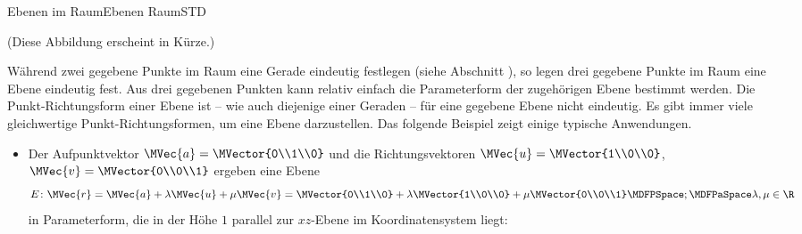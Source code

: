 \begin{MXContent}{Ebenen im Raum}{Ebenen Raum}{STD}
\begin{MInfo}
% 

(Diese Abbildung erscheint in Kürze.)

\end{MInfo}

Während zwei gegebene Punkte im Raum eine Gerade eindeutig festlegen (siehe Abschnitt ), so legen drei gegebene Punkte im Raum eine Ebene eindeutig fest. Aus drei gegebenen Punkten kann relativ einfach die Parameterform der zugehörigen Ebene bestimmt werden. Die Punkt-Richtungsform einer Ebene ist -- wie auch diejenige einer Geraden -- für eine gegebene Ebene nicht eindeutig. Es gibt immer viele gleichwertige Punkt-Richtungsformen, um eine Ebene darzustellen. Das folgende Beispiel zeigt einige typische Anwendungen.

\begin{MExample}
\begin{itemize}
 \item Der Aufpunktvektor $\MVec{a}=\MVector{0\\1\\0}$ und die Richtungsvektoren $\MVec{u}=\MVector{1\\0\\0}$, $\MVec{v}=\MVector{0\\0\\1}$ ergeben eine Ebene
 \[
  E\colon \MVec{r}=\MVec{a}+\lambda\MVec{u}+\mu\MVec{v}=\MVector{0\\1\\0}+\lambda\MVector{1\\0\\0}+\mu\MVector{0\\0\\1}\MDFPSpace;\MDFPaSpace\lambda,\mu\in\R
 \]
 in Parameterform, die in der Höhe $1$ parallel zur $x z$-Ebene im Koordinatensystem liegt:
 

\end{itemize}
\end{MExample}
\end{MXContent}
